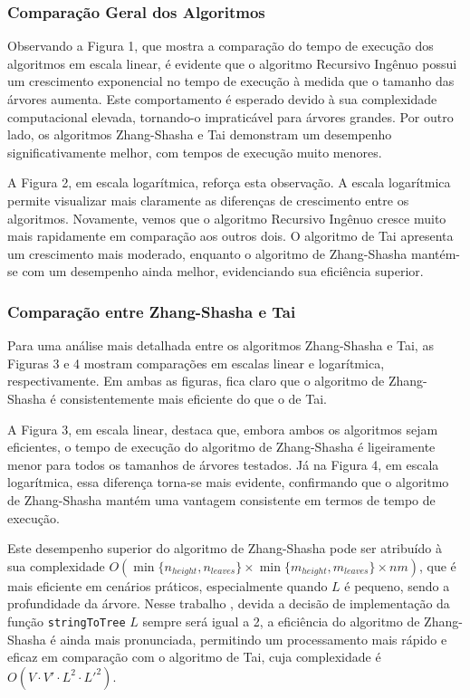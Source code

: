 \documentclass[12pt]{article}
\begin{document}
\subsubsection{Comparação Geral dos Algoritmos}

Observando a Figura 1, que mostra a comparação do tempo de execução dos algoritmos em escala linear, é evidente que o algoritmo Recursivo Ingênuo possui um crescimento exponencial no tempo de execução à medida que o tamanho das árvores aumenta. Este comportamento é esperado devido à sua complexidade computacional elevada, tornando-o impraticável para árvores grandes. Por outro lado, os algoritmos Zhang-Shasha e Tai demonstram um desempenho significativamente melhor, com tempos de execução muito menores.

A Figura 2, em escala logarítmica, reforça esta observação. A escala logarítmica permite visualizar mais claramente as diferenças de crescimento entre os algoritmos. Novamente, vemos que o algoritmo Recursivo Ingênuo cresce muito mais rapidamente em comparação aos outros dois. O algoritmo de Tai apresenta um crescimento mais moderado, enquanto o algoritmo de Zhang-Shasha mantém-se com um desempenho ainda melhor, evidenciando sua eficiência superior.

\subsubsection{Comparação entre Zhang-Shasha e Tai}

Para uma análise mais detalhada entre os algoritmos Zhang-Shasha e Tai, as Figuras 3 e 4 mostram comparações em escalas linear e logarítmica, respectivamente. Em ambas as figuras, fica claro que o algoritmo de Zhang-Shasha é consistentemente mais eficiente do que o de Tai.

A Figura 3, em escala linear, destaca que, embora ambos os algoritmos sejam eficientes, o tempo de execução do algoritmo de Zhang-Shasha é ligeiramente menor para todos os tamanhos de árvores testados. Já na Figura 4, em escala logarítmica, essa diferença torna-se mais evidente, confirmando que o algoritmo de Zhang-Shasha mantém uma vantagem consistente em termos de tempo de execução.

Este desempenho superior do algoritmo de Zhang-Shasha pode ser atribuído à sua complexidade 
\(O(\min\{n_{height}, n_{leaves}\} \times \min\{m_{height}, m_{leaves}\} \times nm)\), 
que é mais eficiente em cenários práticos, especialmente quando \(L\) é pequeno, sendo a profundidade da árvore. Nesse trabalho , devida a decisão de implementação da função \texttt{stringToTree}  \(L\) sempre será igual a 2, a eficiência do algoritmo de Zhang-Shasha é ainda mais pronunciada, permitindo um processamento mais rápido e eficaz em comparação com o algoritmo de Tai, cuja complexidade é 
\(O(V \cdot V' \cdot L^2 \cdot L'^2)\).
\end{document}
